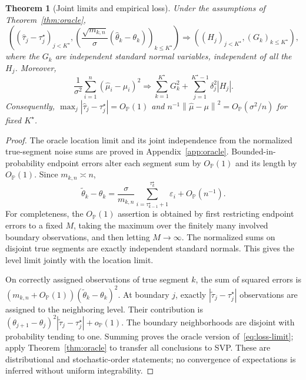 \documentclass[pdflatex,sn-mathphys-num]{sn-jnl}
\newcommand{\Prob}{\mathbb P}
\newcommand{\taus}{\tau^\star}
\newcommand{\op}{o_{\Prob}}
\newcommand{\Op}{O_{\Prob}}
\newcommand{\norm}[1]{\left\lVert#1\right\rVert}
\theoremstyle{thmstyleone}
\newtheorem{theorem}{Theorem}
\theoremstyle{thmstyletwo}
\begin{document}
\begin{theorem}[Joint limits and empirical loss]\label{thm:limits}
Under the assumptions of Theorem~\ref{thm:oracle},
\begin{equation}\label{eq:joint-limit}
\left((\widehat\tau_j-\taus_j)_{j<K^\star},
\left(\frac{\sqrt{m_{k,n}}}{\sigma}(\widehat\theta_k-\theta_k)\right)_{k\le K^\star}\right)
\Longrightarrow ((H_j)_{j<K^\star},(G_k)_{k\le K^\star}),
\end{equation}
where the $G_k$ are independent standard normal variables, independent of
all the $H_j$. Moreover,
\begin{equation}\label{eq:loss-limit}
\frac{1}{\sigma^2}\sum_{i=1}^n(\widehat\mu_i-\mu_i)^2
\Longrightarrow
\sum_{k=1}^{K^\star}G_k^2+
\sum_{j=1}^{K^\star-1}\delta_j^2|H_j|.
\end{equation}
Consequently, $\max_j|\widehat\tau_j-\taus_j|=\Op(1)$ and
$n^{-1}\norm{\widehat\mu-\mu}^2=\Op(\sigma^2/n)$ for fixed $K^\star$.
\end{theorem}
\begin{proof}
The oracle location limit and its joint independence from the normalized
true-segment noise sums are proved in Appendix~\ref{app:oracle}.
Bounded-in-probability endpoint errors alter each segment sum by $\Op(1)$
and its length by $\Op(1)$. Since $m_{k,n}\asymp n$,
\begin{equation}\label{eq:means-expansion}
\widetilde\theta_k-\theta_k
=\frac{\sigma}{m_{k,n}}\sum_{i=\taus_{k-1}+1}^{\taus_k}\varepsilon_i
+\Op(n^{-1}).
\end{equation}
For completeness, the $\Op(1)$ assertion is obtained by first restricting
endpoint errors to a fixed $M$, taking the maximum over the finitely many
involved boundary observations, and then letting $M\to\infty$.
The normalized sums on disjoint true segments are exactly independent
standard normals. This gives the level limit jointly with the location limit.

On correctly assigned observations of true segment $k$, the sum of squared
errors is $(m_{k,n}+\Op(1))(\widetilde\theta_k-\theta_k)^2$.
At boundary $j$, exactly $|\widetilde\tau_j-\taus_j|$ observations are
assigned to the neighboring level. Their contribution is
$(\theta_{j+1}-\theta_j)^2|\widetilde\tau_j-\taus_j|+\op(1)$.
The boundary neighborhoods are disjoint with probability tending to one.
Summing proves the oracle version of~\eqref{eq:loss-limit}; apply
Theorem~\ref{thm:oracle} to transfer all conclusions to SVP.
These are distributional and stochastic-order statements; no convergence
of expectations is inferred without uniform integrability.
\end{proof}
\end{document}
